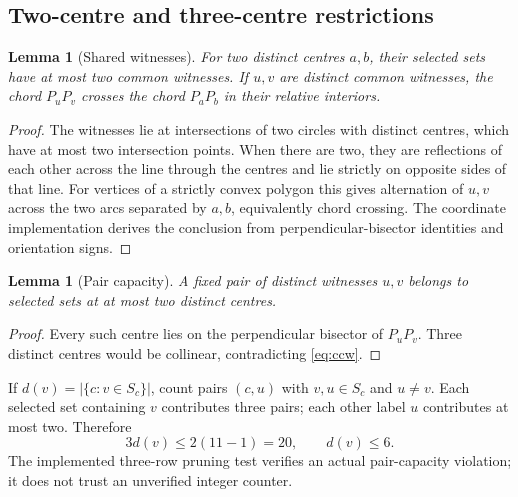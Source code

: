 \documentclass[11pt,a4paper]{article}
\newtheorem{lemma}[theorem]{Lemma}
\theoremstyle{definition}
\begin{document}
\subsection{Two-centre and three-centre restrictions}
\begin{lemma}[Shared witnesses]\label{lem:shared}
For two distinct centres $a,b$, their selected sets have at most two common witnesses. If $u,v$ are distinct common witnesses, the chord $P_uP_v$ crosses the chord $P_aP_b$ in their relative interiors.
\end{lemma}
\begin{proof}
The witnesses lie at intersections of two circles with distinct centres, which have at most two intersection points. When there are two, they are reflections of each other across the line through the centres and lie strictly on opposite sides of that line. For vertices of a strictly convex polygon this gives alternation of $u,v$ across the two arcs separated by $a,b$, equivalently chord crossing. The coordinate implementation derives the conclusion from perpendicular-bisector identities and orientation signs.
\end{proof}
\begin{lemma}[Pair capacity]\label{lem:paircapacity}
A fixed pair of distinct witnesses $u,v$ belongs to selected sets at at most two distinct centres.
\end{lemma}
\begin{proof}
Every such centre lies on the perpendicular bisector of $P_uP_v$. Three distinct centres would be collinear, contradicting \eqref{eq:ccw}.
\end{proof}
If $d(v)=|\{c:v\in S_c\}|$, count pairs $(c,u)$ with $v,u\in S_c$ and $u\ne v$. Each selected set containing $v$ contributes three pairs; each other label $u$ contributes at most two. Therefore
\begin{equation}\label{eq:incoming}
 3d(v)\le2(11-1)=20,\qquad d(v)\le6.
\end{equation}
The implemented three-row pruning test verifies an actual pair-capacity violation; it does not trust an unverified integer counter.
\end{document}
